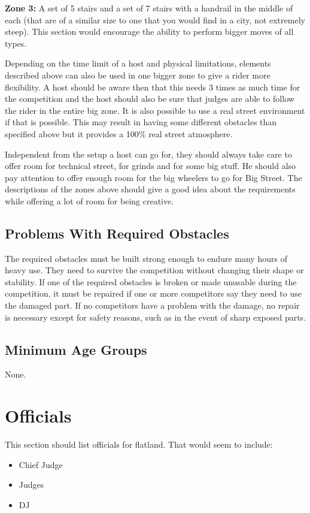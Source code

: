 \textbf{Zone 3:}
A set of 5 stairs and a set of 7 stairs with a handrail in the middle of each (that are of a similar size to one that you would find in a city, not extremely steep).
This section would encourage the ability to perform bigger moves of all types.

Depending on the time limit of a host and physical limitations, elements described above can also be used in one bigger zone to give a rider more flexibility.
A host should be aware then that this needs 3 times as much time for the competition and the host should also be sure that judges are able to follow the rider in the entire big zone.
It is also possible to use a real street environment if that is possible.
This may result in having some different obstacles than specified above but it provides a 100\% real street atmosphere. 

Independent from the setup a host can go for, they should always take care to offer room for technical street, for grinds and for some big stuff.
He should also pay attention to offer enough room for the big wheelers to go for Big Street. 
The descriptions of the zones above should give a good idea about the requirements while offering a lot of room for being creative.

\subsection{Problems With Required Obstacles}
The required obstacles must be built strong enough to endure many hours of heavy use.
They need to survive the competition without changing their shape or stability.
If one of the required obstacles is broken or made unusable during the competition, it must be repaired if one or more competitors say they need to use the damaged part.
If no competitors have a problem with the damage, no repair is necessary except for safety reasons, such as in the event of sharp exposed parts. 

\subsection{Minimum Age Groups}
None.

\section{Officials}

\begin{framed}
This section should list officials for flatland.  That would seem to include:
\begin{itemize}
\item Chief Judge
\item Judges
\item DJ
\end{itemize}
\end{framed}

